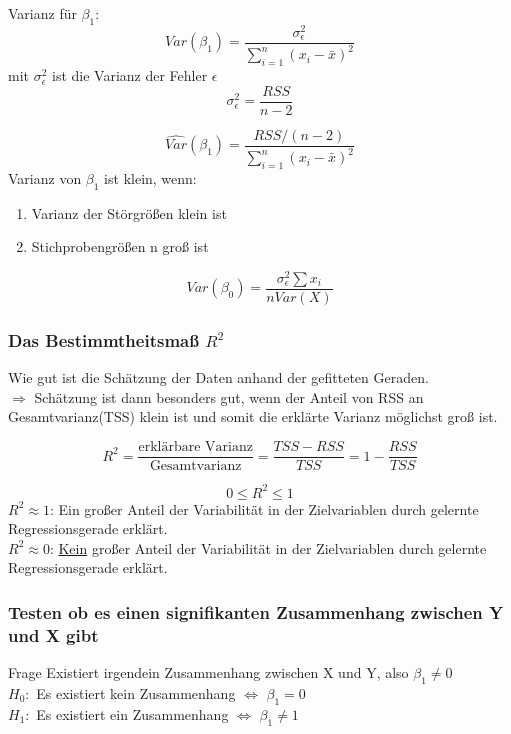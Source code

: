 \documentclass[10pt]{report}
\theoremstyle{definition}
\begin{document}
Varianz für $\beta_1$:
\[ 
	Var(\beta_1)= \frac{\sigma_{\epsilon}^2}{\sum\limits_{i=1}^n (x_i-\bar{x})^2} 
\]
mit $\sigma_{\epsilon}^2$ ist die Varianz der Fehler $\epsilon$
\[\sigma_{\epsilon}^2 = \frac{RSS}{n-2} \]

\[\hat{Var}(\beta_1)=\frac{RSS/(n-2)}{\sum\limits_{i=1}^n (x_i-\bar{x})^2} \]
Varianz von $\beta_1$ ist klein, wenn:
\begin{enumerate}
	\item Varianz der Störgrößen klein ist
	\item Stichprobengrößen n groß ist
\end{enumerate}
\[Var(\beta_0) = \frac{\sigma_\epsilon^2  \sum x_i}{n Var(X)}\]

\subsubsection{Das Bestimmtheitsmaß $R^2$}
Wie gut ist die Schätzung der Daten anhand der gefitteten Geraden. \\
$\Rightarrow$ Schätzung ist dann besonders gut, wenn der Anteil von RSS an Gesamtvarianz(TSS) klein ist und somit die erklärte Varianz möglichst groß ist.

\[ R^2= \frac{\text{erklärbare Varianz}}{\text{Gesamtvarianz}}
= \frac{TSS-RSS}{TSS} = 1 - \frac{RSS}{TSS}\]

\[ 0 \leq R^2 \leq 1\]
$R^2 \approx 1$: Ein großer Anteil der Variabilität in der Zielvariablen durch gelernte Regressionsgerade erklärt. \\
$R^2 \approx 0$: \underline{Kein} großer Anteil der Variabilität in der Zielvariablen durch gelernte Regressionsgerade erklärt.





\subsubsection{Testen ob es einen signifikanten Zusammenhang zwischen Y und X gibt}
Frage Existiert irgendein Zusammenhang zwischen X und Y, also $\beta_1 \neq 0$\\
$H_0:$ Es existiert kein Zusammenhang $ \Leftrightarrow $ $ \beta_1 = 0$\\
$H_1:$ Es existiert ein Zusammenhang $ \Leftrightarrow $ $\beta_1 \neq 1$\\
\end{document}
